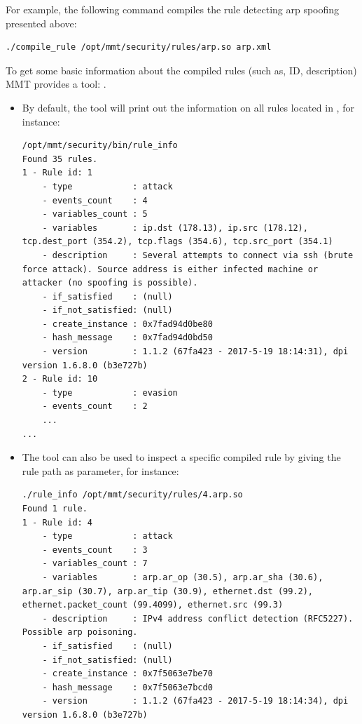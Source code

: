 For example, the following command compiles the rule detecting arp spoofing presented above:

\begin{lstlisting}[style=BASH]
./compile_rule /opt/mmt/security/rules/arp.so arp.xml
\end{lstlisting}

 To get some basic information about the compiled rules (such as, ID, description) MMT provides a tool: .

\begin{itemize}
\item By default, the tool will print out the information on all rules located in , for instance:

\begin{lstlisting}[style=CONFIG]
/opt/mmt/security/bin/rule_info 
Found 35 rules.
1 - Rule id: 1
	- type            : attack
	- events_count    : 4
	- variables_count : 5
	- variables       : ip.dst (178.13), ip.src (178.12), tcp.dest_port (354.2), tcp.flags (354.6), tcp.src_port (354.1)
	- description     : Several attempts to connect via ssh (brute force attack). Source address is either infected machine or attacker (no spoofing is possible).
	- if_satisfied    : (null)
	- if_not_satisfied: (null)
	- create_instance : 0x7fad94d0be80
	- hash_message    : 0x7fad94d0bd50
	- version         : 1.1.2 (67fa423 - 2017-5-19 18:14:31), dpi version 1.6.8.0 (b3e727b)
2 - Rule id: 10
	- type            : evasion
	- events_count    : 2
	...
...
\end{lstlisting}

\item The tool can also be used to inspect a specific compiled rule by giving the rule path as parameter, for instance:

\begin{lstlisting}
./rule_info /opt/mmt/security/rules/4.arp.so 
Found 1 rule.
1 - Rule id: 4
	- type            : attack
	- events_count    : 3
	- variables_count : 7
	- variables       : arp.ar_op (30.5), arp.ar_sha (30.6), arp.ar_sip (30.7), arp.ar_tip (30.9), ethernet.dst (99.2), ethernet.packet_count (99.4099), ethernet.src (99.3)
	- description     : IPv4 address conflict detection (RFC5227). Possible arp poisoning.
	- if_satisfied    : (null)
	- if_not_satisfied: (null)
	- create_instance : 0x7f5063e7be70
	- hash_message    : 0x7f5063e7bcd0
	- version         : 1.1.2 (67fa423 - 2017-5-19 18:14:34), dpi version 1.6.8.0 (b3e727b)
\end{lstlisting}
\end{itemize}
